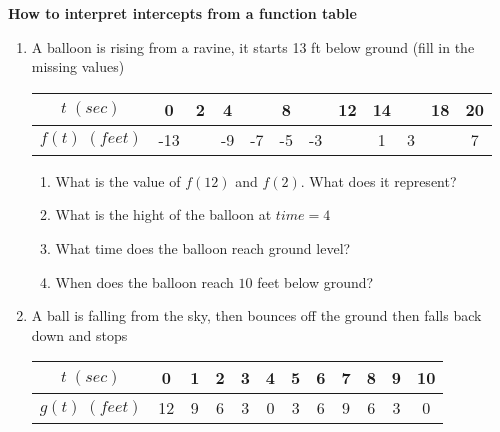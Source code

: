\documentclass{article}
\begin{document}
\vspace{1cm}
\textbf{How to interpret intercepts from a function table} \\
\begin{enumerate}[label=\textbf{\arabic*.}]
\item A balloon is rising from a ravine, it starts 13 ft below ground (fill in the missing values)
\begin{center}
\begin{tabular}{ |c|c|c|c|c|c|c|c|c|c|c|c| } 
 \hline
 $t \; (sec)$ & 0 & 2 & 4 & \hspace{0.35cm} & 8 & \hspace{0.35cm} & 12 & 14 & \hspace{0.35cm} & 18 & 20 \\
 \hline
 $f(t) \; (feet)$ & -13 & \hspace{0.35cm} & -9 & -7 & -5 & -3 & \hspace{0.35cm} & 1 & 3 & \hspace{0.35cm} & 7\\ 
 \hline

\end{tabular}
\end{center}
\begin{enumerate}[label=\textbf{\alph*.}]
    \item What is the value of $f(12)$ and $f(2)$. What does it represent?
    \vspace{1.25cm}
    \item What is the hight of the balloon at $time=4$
    \vspace{1.25cm}
    \item What time does the balloon reach ground level?    
    \vspace{1.25cm}
    \item When does the balloon reach $10$ feet below ground?

\end{enumerate}
\vspace{1cm}
\item A ball is falling from the sky, then bounces off the ground then falls back down and stops
\begin{center}
\begin{tabular}{ |c|c|c|c|c|c|c|c|c|c|c|c| } 
 \hline
 $t \; (sec)$ & 0 & 1 & 2 & 3 & 4 & 5 & 6 & 7 & 8 & 9 & 10 \\
 \hline
 $g(t) \; (feet)$ & 12 & 9 & 6 & 3 & 0 & 3 & 6 & 9 & 6 & 3 & 0\\ 
 \hline


\end{tabular}
\end{center}
\end{enumerate}
\end{document}
